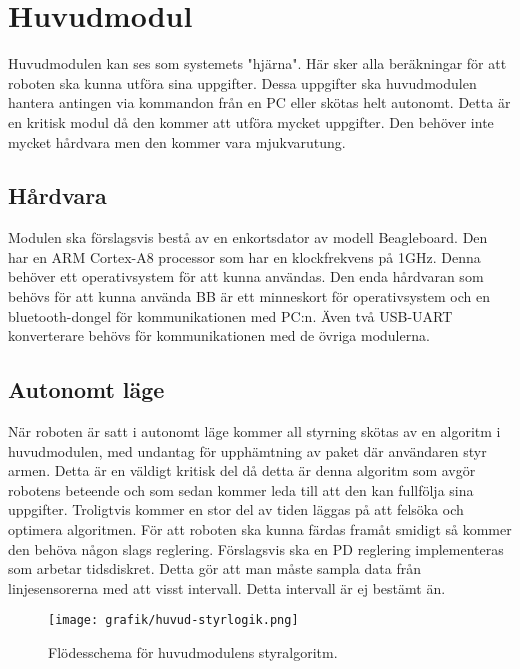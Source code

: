 \section{Huvudmodul}
Huvudmodulen kan ses som systemets "hjärna". Här sker alla beräkningar för att roboten ska kunna utföra sina uppgifter. Dessa uppgifter ska huvudmodulen hantera antingen via kommandon från en PC eller skötas helt autonomt. Detta är en kritisk modul då den kommer att utföra mycket uppgifter. Den behöver inte mycket hårdvara men den kommer vara mjukvarutung.
\subsection{Hårdvara}
Modulen ska förslagsvis bestå av en enkortsdator av modell Beagleboard. Den har en ARM Cortex-A8 processor som har en klockfrekvens på 1GHz. Denna behöver ett operativsystem för att kunna användas. Den enda hårdvaran som behövs för att kunna använda BB är ett minneskort för operativsystem och en bluetooth-dongel för kommunikationen med PC:n. Även två USB-UART konverterare behövs för kommunikationen med de övriga modulerna.
\subsection{Autonomt läge}
När roboten är satt i autonomt läge kommer all styrning skötas av en algoritm i huvudmodulen, med undantag för upphämtning av paket där användaren styr armen. Detta är en väldigt kritisk del då detta är denna algoritm som avgör robotens beteende och som sedan kommer leda till att den kan fullfölja sina uppgifter. Troligtvis kommer en stor del av tiden läggas på att felsöka och optimera algoritmen.
För att roboten ska kunna färdas framåt smidigt så kommer den behöva någon slags reglering. Förslagsvis ska en PD reglering implementeras som arbetar tidsdiskret. Detta gör att man måste sampla data från linjesensorerna med att visst intervall. Detta intervall är ej bestämt än.


\begin{figure}[h]
\center
\texttt{[image: grafik/huvud-styrlogik.png]}
\caption{Flödesschema för huvudmodulens styralgoritm.} \label{systemskiss:autonomtschema}
\end{figure}

